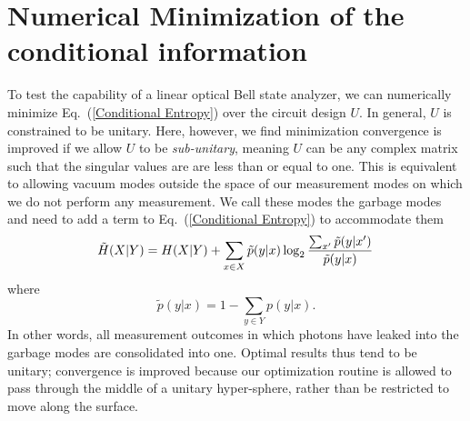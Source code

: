 \documentclass[aps,pra,twocolumn,showpacs,superscriptaddress,floatfix,10pt]{revtex4}
\begin{document}
\section{Numerical Minimization of the conditional information}
\label{Section on Numerical Minimization}
To test the capability of a linear optical Bell state analyzer, we can numerically minimize Eq.~(\ref{Conditional Entropy}) over the circuit design $U$. In general, $U$ is constrained to be unitary. Here, however, we find minimization convergence is improved if we allow $U$ to be \textit{sub-unitary}, meaning $U$ can be any complex matrix such that the singular values are are less than or equal to one. This is equivalent to allowing vacuum modes outside the space of our measurement modes on which we do not perform any measurement. We call these modes the garbage modes and need to add a term to Eq.~(\ref{Conditional Entropy}) to accommodate them
\begin{equation}
\label{Condition Information with Garbage modes}
\small	\tilde{H}(X|Y) = H(X|Y) + \sum_{x \in X} \tilde{p}(y|x) \log_2 \frac{\sum_{x^\prime} \tilde{p}(y|x^\prime)}{\tilde{p}(y|x)}\,
\end{equation}
where
\begin{equation}
	\tilde{p}(y|x) = 1 - \sum_{y \in Y} p(y|x).
\end{equation}
In other words, all measurement outcomes in which photons have leaked into the garbage modes are consolidated into one. Optimal results thus tend to be unitary; convergence is improved because our optimization routine is allowed to pass through the middle of a unitary hyper-sphere, rather than be restricted to move along the surface.
\end{document}
